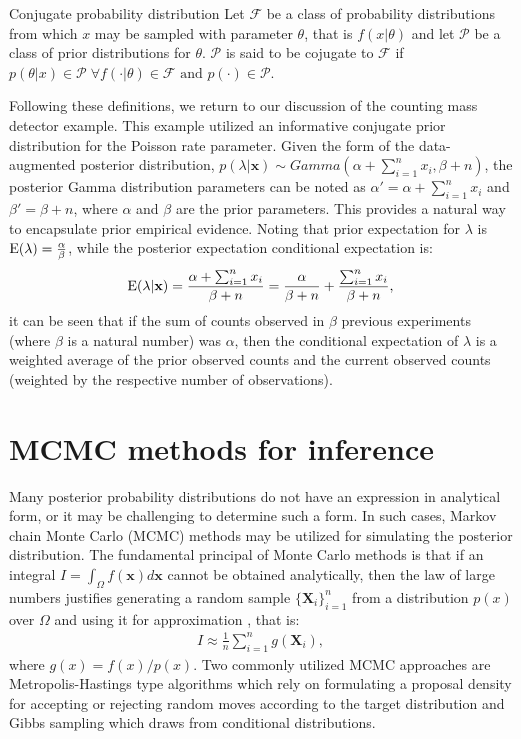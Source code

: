 \begin{DoubleSpace*}
\begin{definition}{Conjugate probability distribution}
	Let $\mathcal{F}$ be a class of probability distributions from which $x$ may be sampled with parameter $\theta$, that is $f(x|\theta)$ and let $\mathcal{P}$ be a class of prior distributions for $\theta$. $\mathcal{P}$ is said to be cojugate to $\mathcal{F}$ if $p(\theta|x)\in \mathcal{P} \; \forall f(\cdot | \theta) \in \mathcal{F} \text{ and } p(\cdot) \in \mathcal{P}$.
\end{definition}

Following these definitions, we return to our discussion of the counting mass detector example. This example utilized an informative conjugate prior distribution for the Poisson rate parameter. Given the form of the data-augmented posterior distribution, $p(\lambda|\textbf{x})\sim Gamma(\alpha+ \sum_{i=1}^n x_i, \beta+n)$,  the posterior Gamma distribution parameters can be noted as $\alpha'=\alpha+ \sum_{i=1}^n x_i$ and $\beta'=\beta+n$, where $\alpha$ and $\beta$ are the prior parameters. This provides a natural way to encapsulate prior empirical evidence. Noting that prior expectation for $\lambda$ is $\operatorname{E}(\lambda)=\frac{\alpha}{\beta}$, while the posterior expectation conditional expectation is:
\begin{align}
	\operatorname{E}(\lambda|\textbf{x})=\frac{\alpha+ \sum_{i=1}^n x_i}{\beta+n} =\frac{\alpha}{\beta+n}+\frac{\sum_{i=1}^n x_i}{\beta+n},
\end{align} it can be seen that if the sum of counts observed in $\beta$ previous experiments (where $\beta$ is a natural number) was $\alpha$, then the conditional expectation of $\lambda$ is a weighted average of the prior observed counts and the current observed counts (weighted by the respective number of observations). 

\section{MCMC methods for inference}
Many posterior probability distributions do not have an expression in analytical form, or it may be challenging to determine such a form. In such cases, Markov chain Monte Carlo (MCMC) methods may be utilized for simulating the posterior distribution. The fundamental principal of Monte Carlo methods is that if an integral $I=\int_{\Omega} f(\textbf{x}) d\textbf{x}$ cannot be obtained analytically, then the law of large numbers justifies generating a random sample $\{\textbf{X}_i \}_{i=1}^n$ from a distribution $p(x)$ over $\Omega$ and using it for approximation \cite{gelman2004}, that is:
\begin{align}
I \approx  \frac{1}{n} \sum_{i=1}^n g(\textbf{X}_i),
\end{align}
where $g(x)= f(x) / p(x)$. Two commonly utilized MCMC approaches are Metropolis-Hastings type algorithms which rely on formulating a proposal density for accepting or rejecting random moves according to the target distribution and Gibbs sampling which draws from conditional distributions.


\end{DoubleSpace*}
